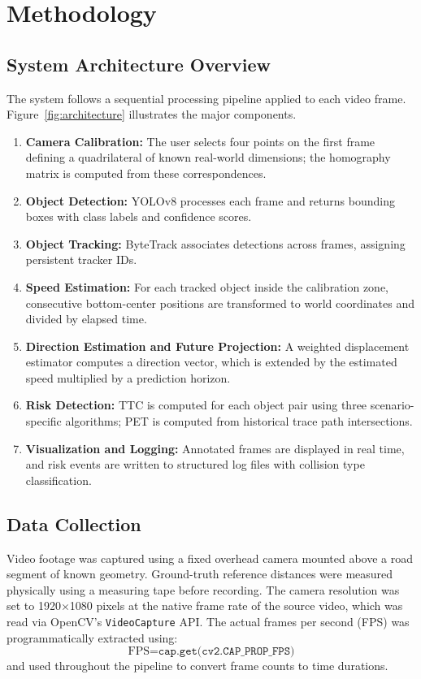 \documentclass[12pt]{report}
\begin{document}
\chapter{Methodology}

\section{System Architecture Overview}

The system follows a sequential processing pipeline applied to each video frame.
Figure~\ref{fig:architecture} illustrates the major components.

\begin{enumerate}
    \item \textbf{Camera Calibration:} The user selects four points on the first frame defining a quadrilateral of known real-world dimensions; the homography matrix is computed from these correspondences.
    \item \textbf{Object Detection:} YOLOv8 processes each frame and returns bounding boxes with class labels and confidence scores.
    \item \textbf{Object Tracking:} ByteTrack associates detections across frames, assigning persistent tracker IDs.
    \item \textbf{Speed Estimation:} For each tracked object inside the calibration zone, consecutive bottom-center positions are transformed to world coordinates and divided by elapsed time.
    \item \textbf{Direction Estimation and Future Projection:} A weighted displacement estimator computes a direction vector, which is extended by the estimated speed multiplied by a prediction horizon.
    \item \textbf{Risk Detection:} TTC is computed for each object pair using three scenario-specific algorithms; PET is computed from historical trace path intersections.
    \item \textbf{Visualization and Logging:} Annotated frames are displayed in real time, and risk events are written to structured log files with collision type classification.
\end{enumerate}

\section{Data Collection}

Video footage was captured using a fixed overhead camera mounted above a road segment of known geometry.
Ground-truth reference distances were measured physically using a measuring tape before recording.
The camera resolution was set to 1920$\times$1080 pixels at the native frame rate of the source video, which was read via OpenCV's \texttt{VideoCapture} API.
The actual frames per second (FPS) was programmatically extracted using:
\begin{equation}
    \text{FPS} = \texttt{cap.get(cv2.CAP\_PROP\_FPS)}
\end{equation}
and used throughout the pipeline to convert frame counts to time durations.
\end{document}
